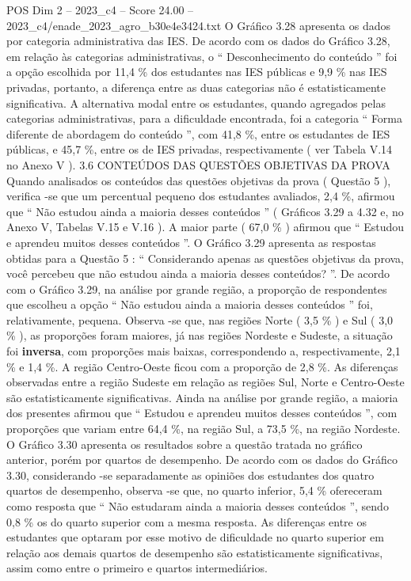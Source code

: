 \begin{textsample}{POS Dim 2 – 2023\_c4 – Score 24.00 – 2023\_c4/enade\_2023\_agro\_b30e4e3424.txt}
O Gráfico 3.28 apresenta os dados por categoria administrativa das IES.
De acordo com os dados do Gráfico 3.28, em relação às categorias administrativas, o “ Desconhecimento do conteúdo ” foi a opção escolhida por 11,4 \% dos estudantes nas IES públicas e 9,9 \% nas IES privadas, portanto, a diferença entre as duas categorias não é estatisticamente significativa.
A alternativa modal entre os estudantes, quando agregados pelas categorias administrativas, para a dificuldade encontrada, foi a categoria “ Forma diferente de abordagem do conteúdo ”, com 41,8 \%, entre os estudantes de IES públicas, e 45,7 \%, entre os de IES privadas, respectivamente ( ver Tabela V.14 no Anexo V ). 3.6 CONTEÚDOS DAS QUESTÕES OBJETIVAS DA PROVA Quando analisados os conteúdos das questões objetivas da prova ( Questão 5 ), verifica -se que um percentual pequeno dos estudantes avaliados, 2,4 \%, afirmou que “ Não estudou ainda a maioria desses conteúdos ” ( Gráficos 3.29 a 4.32 e, no Anexo V, Tabelas V.15 e V.16 ).
A maior parte ( 67,0 \% ) afirmou que “ Estudou e aprendeu muitos desses conteúdos ”.
O Gráfico 3.29 apresenta as respostas obtidas para a Questão 5 : “ Considerando apenas as questões objetivas da prova, você percebeu que não estudou ainda a maioria desses conteúdos? ”.
De acordo com o Gráfico 3.29, na análise por grande região, a proporção de respondentes que escolheu a opção “ Não estudou ainda a maioria desses conteúdos ” foi, relativamente, pequena.
Observa -se que, nas regiões Norte ( 3,5 \% ) e Sul ( 3,0 \% ), as proporções foram maiores, já nas regiões Nordeste e Sudeste, a situação foi \textbf{inversa}, com proporções mais baixas, correspondendo a, respectivamente, 2,1 \% e 1,4 \%.
A região Centro-Oeste ficou com a proporção de 2,8 \%.
As diferenças observadas entre a região Sudeste em relação as regiões Sul, Norte e Centro-Oeste são estatisticamente significativas.
Ainda na análise por grande região, a maioria dos presentes afirmou que “ Estudou e aprendeu muitos desses conteúdos ”, com proporções que variam entre 64,4 \%, na região Sul, a 73,5 \%, na região Nordeste.
O Gráfico 3.30 apresenta os resultados sobre a questão tratada no gráfico anterior, porém por quartos de desempenho.
De acordo com os dados do Gráfico 3.30, considerando -se separadamente as opiniões dos estudantes dos quatro quartos de desempenho, observa -se que, no quarto inferior, 5,4 \% ofereceram como resposta que “ Não estudaram ainda a maioria desses conteúdos ”, sendo 0,8 \% os do quarto superior com a mesma resposta.
As diferenças entre os estudantes que optaram por esse motivo de dificuldade no quarto superior em relação aos demais quartos de desempenho são estatisticamente significativas, assim como entre o primeiro e quartos intermediários.

\end{textsample}
